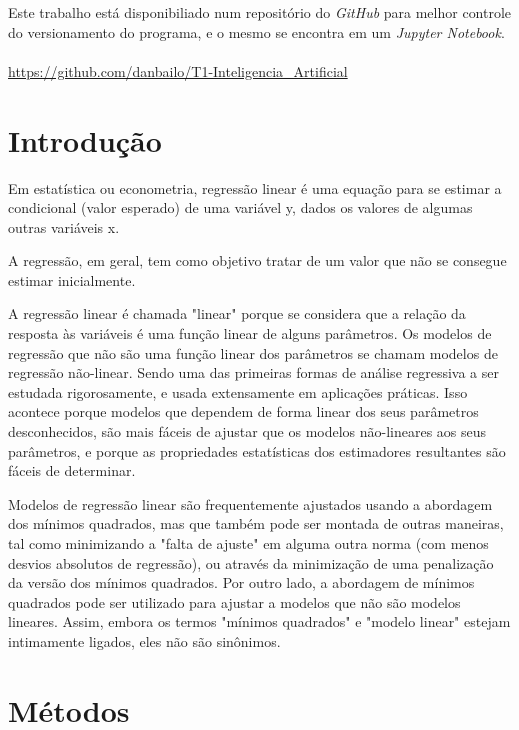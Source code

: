 \documentclass[a4paper, 12pt]{article}
\begin{document}

Este trabalho está disponibiliado num repositório do {\it GitHub} para melhor controle do versionamento do 
programa, e o mesmo se encontra em um \textit{Jupyter Notebook}.\\~\\
\url{https://github.com/danbailo/T1-Inteligencia_Artificial}
\clearpage

\section{Introdução}

Em estatística ou econometria, regressão linear é uma equação para se estimar a condicional (valor esperado) de uma
variável y, dados os valores de algumas outras variáveis x.

A regressão, em geral, tem como objetivo tratar de um valor que não se consegue estimar inicialmente.

A regressão linear é chamada "linear" porque se considera que a relação da resposta às variáveis é uma função 
linear de alguns parâmetros. Os modelos de regressão que não são uma função linear dos parâmetros se chamam modelos 
de regressão não-linear. Sendo uma das primeiras formas de análise regressiva a ser estudada rigorosamente, e usada 
extensamente em aplicações práticas. Isso acontece porque modelos que dependem de forma linear dos seus parâmetros 
desconhecidos, são mais fáceis de ajustar que os modelos não-lineares aos seus parâmetros, e porque as propriedades 
estatísticas dos estimadores resultantes são fáceis de determinar.

Modelos de regressão linear são frequentemente ajustados usando a abordagem dos mínimos quadrados, mas que também 
pode ser montada de outras maneiras, tal como minimizando a "falta de ajuste" em alguma outra norma (com menos desvios 
absolutos de regressão), ou através da minimização de uma penalização da versão dos mínimos quadrados. Por outro 
lado, a abordagem de mínimos quadrados pode ser utilizado para ajustar a modelos que não são modelos lineares. Assim, 
embora os termos "mínimos quadrados" e "modelo linear" estejam intimamente ligados, eles não são sinônimos. 

\clearpage

\section{Métodos}
\end{document}
